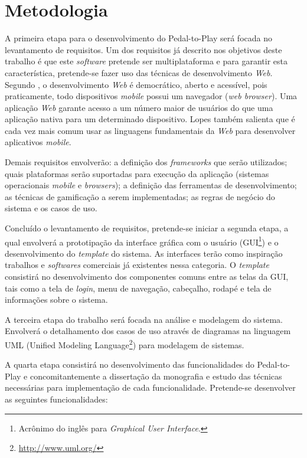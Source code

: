 \chapter{Metodologia} \label{cap:metodologia}
A primeira etapa para o desenvolvimento do Pedal-to-Play será focada no levantamento de requisitos. Um dos requisitos já descrito nos objetivos deste trabalho é que este \textit{software} pretende ser multiplataforma e para garantir esta característica, pretende-se fazer uso das técnicas de desenvolvimento \textit{Web}. Segundo \citet{lopes2013}, o desenvolvimento \textit{Web} é democrático, aberto e acessível, pois praticamente, todo dispositivos \textit{mobile} possui um navegador (\textit{web browser}). Uma aplicação \textit{Web} garante acesso a um número maior de usuários do que uma aplicação nativa para um determinado dispositivo. Lopes também salienta que é cada vez mais comum usar as linguagens fundamentais da \textit{Web} para desenvolver aplicativos \textit{mobile}. \par

Demais requisitos envolverão: a definição dos \textit{frameworks} que serão utilizados; quais plataformas serão suportadas para execução da aplicação (sistemas operacionais \textit{mobile} e \textit{browsers}); a definição das ferramentas de desenvolvimento; as técnicas de gamificação a serem implementadas; as regras de negócio do sistema e os casos de uso. \par

Concluído o levantamento de requisitos, pretende-se iniciar a segunda etapa, a qual envolverá a prototipação da interface gráfica com o usuário (GUI\footnote{Acrônimo do inglês para \textit{Graphical User Interface}.}) e o desenvolvimento do \textit{template} do sistema. As interfaces terão como inspiração trabalhos e \textit{softwares} comerciais já existentes nessa categoria. O \textit{template} consistirá no desenvolvimento dos componentes comuns entre as telas da GUI, tais como a tela de \textit{login}, menu de navegação, cabeçalho, rodapé e tela de informações sobre o sistema. 

A terceira etapa do trabalho será focada na análise e modelagem do sistema. Envolverá o detalhamento dos casos de uso através de diagramas na linguagem UML (Unified Modeling Language\footnote{\url{http://www.uml.org/}}) para modelagem de sistemas. \par

A quarta etapa consistirá no desenvolvimento das funcionalidades do Pedal-to-Play e concomitantemente a dissertação da monografia e estudo das técnicas necessárias para implementação de cada funcionalidade. Pretende-se desenvolver as seguintes funcionalidades: \par

